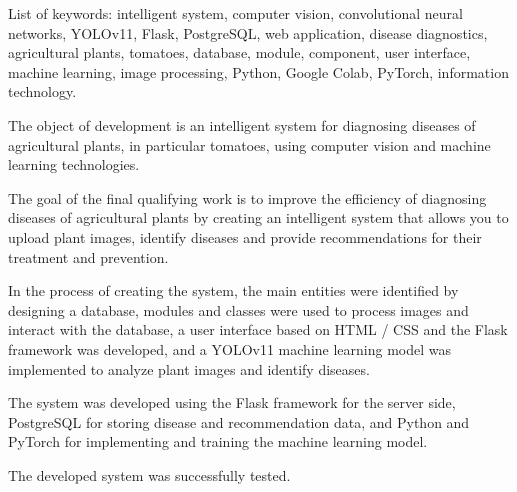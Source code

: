 List of keywords: intelligent system, computer vision, convolutional neural networks, YOLOv11, Flask, PostgreSQL, web application, disease diagnostics, agricultural plants, tomatoes, database, module, component, user interface, machine learning, image processing, Python, Google Colab, PyTorch, information technology.

The object of development is an intelligent system for diagnosing diseases of agricultural plants, in particular tomatoes, using computer vision and machine learning technologies.

The goal of the final qualifying work is to improve the efficiency of diagnosing diseases of agricultural plants by creating an intelligent system that allows you to upload plant images, identify diseases and provide recommendations for their treatment and prevention.

In the process of creating the system, the main entities were identified by designing a database, modules and classes were used to process images and interact with the database, a user interface based on HTML / CSS and the Flask framework was developed, and a YOLOv11 machine learning model was implemented to analyze plant images and identify diseases.

The system was developed using the Flask framework for the server side, PostgreSQL for storing disease and recommendation data, and Python and PyTorch for implementing and training the machine learning model.

The developed system was successfully tested.

